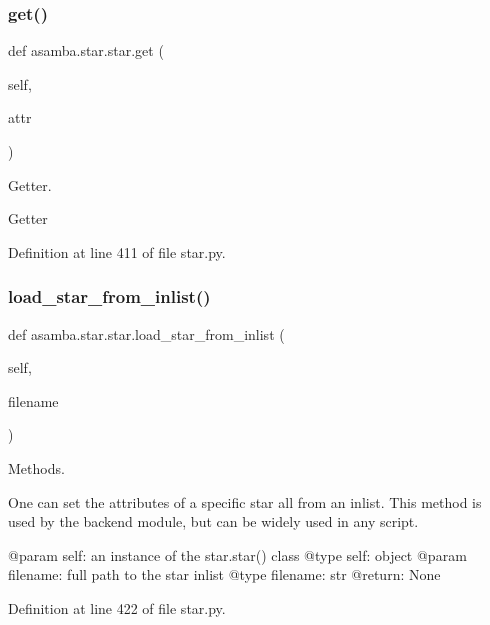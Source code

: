 \subsubsection{\texorpdfstring{get()}{get()}}
{\footnotesize\ttfamily def asamba.\+star.\+star.\+get (\begin{DoxyParamCaption}\item[{}]{self,  }\item[{}]{attr }\end{DoxyParamCaption})}



Getter. 

\begin{DoxyVerb}Getter \end{DoxyVerb}
 

Definition at line 411 of file star.\+py.

\mbox{\label{classasamba_1_1star_1_1star_aec75624cd5c21ff1f0121012ccb01903}} 
\subsubsection{\texorpdfstring{load\+\_\+star\+\_\+from\+\_\+inlist()}{load\_star\_from\_inlist()}}
{\footnotesize\ttfamily def asamba.\+star.\+star.\+load\+\_\+star\+\_\+from\+\_\+inlist (\begin{DoxyParamCaption}\item[{}]{self,  }\item[{}]{filename }\end{DoxyParamCaption})}



Methods. 

\begin{DoxyVerb}One can set the attributes of a specific star all from an inlist. This method is used by the 
backend module, but can be widely used in any script.

@param self: an instance of the star.star() class 
@type self: object
@param filename: full path to the star inlist
@type filename: str
@return: None
\end{DoxyVerb}
 

Definition at line 422 of file star.\+py.

